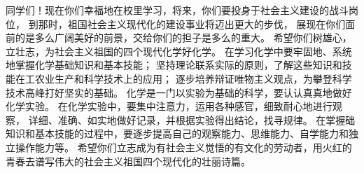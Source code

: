 同学们！现在你们幸福地在校里学习，将来，你们要投身于社会主义建设的战斗岗位，
到那时，祖国社会主义现代化的建设事业将迈出更大的步伐，
展现在你们面前的是多么广阔美好的前景，交给你们的担子是多么的重大。
希望你们树雄心，立壮志，为社会主义祖国的四个现代化学好化学。
在学习化学中要牢固地、系统地掌握化学基础知识和基本技能；
坚持理论联系实际的原则，了解这些知识和技能在工农业生产和科学技术上的应用；
逐步培养辩证唯物主义观点，为攀登科学技术高峰打好坚实的基础。
化学是一门以实验为基础的科学，要认认真真地做好化学实验。
在化学实验中，要集中注意力，运用各种感官，细致耐心地进行观察，
详细、准确、如实地做好记录，并根据实验得出结论，找寻规律。
在掌握础知识和基本技能的过程中，要逐步提高自己的观察能力、思维能力、自学能力和独立操作能力等。
希望你们立志成为有社会主义觉悟的有文化的劳动者，用火红的青春去谱写伟大的社会主义祖国四个现代化的壮丽诗篇。


\begin{xiti}


\begin{xiaoxiaotis}









\end{xiaoxiaotis}


\end{xiti}

